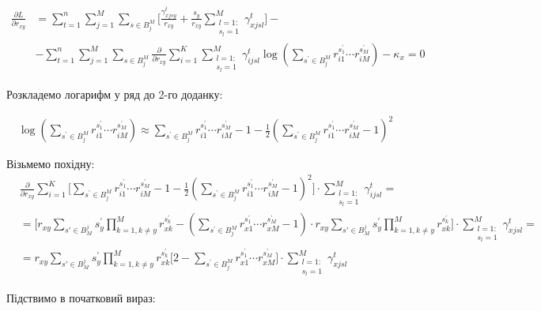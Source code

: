\documentclass[14pt]{article}
\begin{document}
\pagebreak

\begin{align*}
\frac{\partial L}{\partial r_{xy}} &= \sum_{t=1}^{n} \sum_{j=1}^{M} \sum_{s \in B^M_j} \Big[\frac{\gamma_{xjsy}^t }{r_{xy}} + 
\frac{s_y}{r_{xy}}\sum_{\substack{l=1:\\ s_l=1}}^{M} \gamma_{xjsl}^t \Big] - \\
& - \sum_{t=1}^{n} \sum_{j=1}^{M} \sum_{s \in B^M_j} \frac{\partial}{\partial r_{xy}} \sum_{i=1}^{K} \sum_{\substack{l=1:\\ s_l=1}}^{M} \gamma_{ijsl}^t \log{\left( \sum_{s^{'} \in B^M_j}  r_{i1}^{s^{'}_1} \cdots r_{iM}^{s^{'}_M} \right)}  - \kappa_x = 0
\end{align*}

Розкладемо логарифм у ряд до 2-го доданку:


\begin{align*}
\log{\left( \sum_{s^{'} \in B^M_j}  r_{i1}^{s^{'}_1} \cdots r_{iM}^{s^{'}_M} \right)} \approx \sum_{s^{'} \in B^M_j}  r_{i1}^{s^{'}_1} \cdots r_{iM}^{s^{'}_M} - 1 - \frac{1}{2} \left(\sum_{s^{'} \in B^M_j}  r_{i1}^{s^{'}_1} \cdots r_{iM}^{s^{'}_M} - 1 \right)^2
\end{align*}

Візьмемо похідну: \\


\begin{align*}
& \frac{\partial}{\partial r_{xy}} \sum_{i=1}^{K} 
\Bigg[ \sum_{s^{'} \in B^M_j}  r_{i1}^{s^{'}_1} \cdots r_{iM}^{s^{'}_M} - 1 - \frac{1}{2} \left(\sum_{s^{'} \in B^M_j}  r_{i1}^{s^{'}_1} \cdots r_{iM}^{s^{'}_M} - 1 \right)^2 \Bigg]
\cdot \sum_{\substack{l=1:\\ s_l=1}}^{M} \gamma_{ijsl}^t  = \\
& =
\Bigg[ r_{xy} \sum_{s' \in B^j_M} s^{'}_y \prod_{k=1,  k \neq y}^{M} r_{xk}^{s^{'}_k} - \left(\sum_{s^{'} \in B^M_j}  r_{x1}^{s^{'}_1} \cdots r_{xM}^{s^{'}_M} - 1 \right) \cdot r_{xy} \sum_{s' \in B^j_M} s^{'}_y \prod_{k=1,  k \neq y}^{M} r_{xk}^{s^{'}_k} \Bigg] \cdot \sum_{\substack{l=1:\\ s_l=1}}^{M} \gamma_{xjsl}^t = \\
& = r_{xy} \sum_{s' \in B^j_M} s^{'}_y \prod_{k=1,  k \neq y}^{M} r_{xk}^{s^{'}_k} \Bigg[ 2 - \sum_{s^{'} \in B^M_j}  r_{x1}^{s^{'}_1} \cdots r_{xM}^{s^{'}_M} \Bigg] \cdot \sum_{\substack{l=1:\\ s_l=1}}^{M} \gamma_{xjsl}^t 
\end{align*}

Підствимо в початковий вираз: \\
\end{document}
